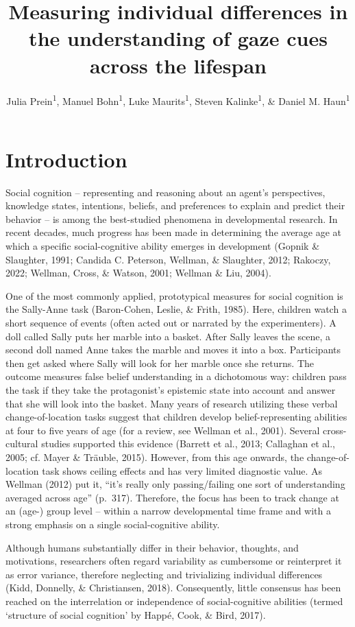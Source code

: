 \documentclass[
  man,floatsintext]{apa6}
\title{Measuring individual differences in the understanding of gaze cues across the lifespan}
\author{Julia Prein\textsuperscript{1}, Manuel Bohn\textsuperscript{1}, Luke Maurits\textsuperscript{1}, Steven Kalinke\textsuperscript{1}, \& Daniel M. Haun\textsuperscript{1}}
\date{}
\affiliation{\vspace{0.5cm}\textsuperscript{1} Department of Comparative Cultural Psychology, Max Planck Institute for Evolutionary Anthropology, Leipzig, Germany}
\begin{document}
\maketitle

\hypertarget{introduction}{%
\section{Introduction}\label{introduction}}

Social cognition -- representing and reasoning about an agent's perspectives, knowledge states, intentions, beliefs, and preferences to explain and predict their behavior -- is among the best-studied phenomena in developmental research.
In recent decades, much progress has been made in determining the average age at which a specific social-cognitive ability emerges in development (Gopnik \& Slaughter, 1991; Candida C. Peterson, Wellman, \& Slaughter, 2012; Rakoczy, 2022; Wellman, Cross, \& Watson, 2001; Wellman \& Liu, 2004).

One of the most commonly applied, prototypical measures for social cognition is the Sally-Anne task (Baron-Cohen, Leslie, \& Frith, 1985).
Here, children watch a short sequence of events (often acted out or narrated by the experimenters).
A doll called Sally puts her marble into a basket.
After Sally leaves the scene, a second doll named Anne takes the marble and moves it into a box.
Participants then get asked where Sally will look for her marble once she returns.
The outcome measures false belief understanding in a dichotomous way:
children pass the task if they take the protagonist's epistemic state into account and answer that she will look into the basket.
Many years of research utilizing these verbal change-of-location tasks suggest that children develop belief-representing abilities at four to five years of age (for a review, see Wellman et al., 2001).
Several cross-cultural studies supported this evidence (Barrett et al., 2013; Callaghan et al., 2005; cf. Mayer \& Träuble, 2015).
However, from this age onwards, the change-of-location task shows ceiling effects and has very limited diagnostic value.
As Wellman (2012) put it, ``it's really only passing/failing one sort of understanding averaged across age'' (p.~317).
Therefore, the focus has been to track change at an (age-) group level --
within a narrow developmental time frame and with a strong emphasis on a single social-cognitive ability.

Although humans substantially differ in their behavior, thoughts, and motivations, researchers often regard variability as cumbersome or reinterpret it as error variance, therefore neglecting and trivializing individual differences (Kidd, Donnelly, \& Christiansen, 2018).
Consequently, little consensus has been reached on the interrelation or independence of social-cognitive abilities (termed `structure of social cognition' by Happé, Cook, \& Bird, 2017).
\end{document}
